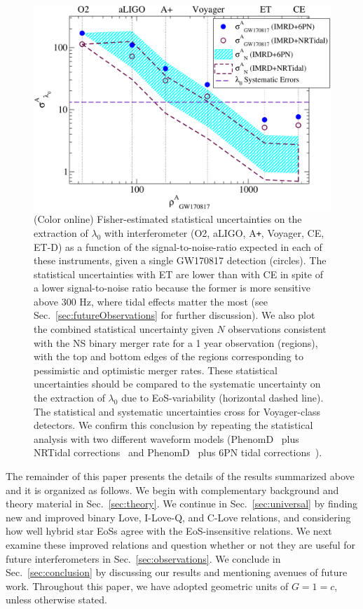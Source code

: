 \documentclass[prd,twocolumn,nofootinbib,superscriptaddress,amsmath,amssymb]{revtex4-1}
\begin{document}
\begin{figure}
\begin{center} 
\includegraphics[width=\columnwidth]{stackedFisher.pdf}
\end{center}
\caption{(Color online) Fisher-estimated statistical uncertainties on the extraction of $\lambda_{0}$ with interferometer (O2, aLIGO, A\texttt{+}, Voyager, CE, ET-D) as a function of the signal-to-noise-ratio expected in each of these instruments, given a single GW170817 detection (circles). The statistical uncertainties with ET are lower than with CE in spite of a lower signal-to-noise ratio because the former is more sensitive above 300 Hz, where tidal effects matter the most (see Sec.~\ref{sec:futureObservations} for further discussion). We also plot the combined statistical uncertainty given $N$ observations consistent with the NS binary merger rate for a 1 year observation (regions), with the top and bottom edges of the regions corresponding to pessimistic and optimistic merger rates. These statistical uncertainties should be compared to the systematic uncertainty on the extraction of $\lambda_{0}$ due to EoS-variability (horizontal dashed line). The statistical and systematic uncertainties cross for Voyager-class detectors. We confirm this conclusion by repeating the statistical analysis with two different waveform models (PhenomD~\cite{PhenomDI,PhenomDII} plus NRTidal corrections~\cite{Dietrich:2017aum,Samajdar:NRTidal} and PhenomD~\cite{PhenomDI,PhenomDII} plus 6PN tidal corrections~\cite{Vines:2011ud,Wade:tidalCorrections}).}
\label{fig:stackedFisher}
\end{figure} 

The remainder of this paper presents the details of the results summarized above and it is organized as follows. 
We begin with complementary background and theory material in Sec.~\ref{sec:theory}.
We continue in Sec.~\ref{sec:universal} by finding new and improved binary Love, I-Love-Q, and C-Love relations, and considering how well hybrid star EoSs agree with the EoS-insensitive relations.
We next examine these improved relations and question whether or not they are useful for future interferometers in Sec.~\ref{sec:observations}.
We conclude in Sec.~\ref{sec:conclusion} by discussing our results and mentioning avenues of future work.
Throughout this paper, we have adopted geometric units of $G=1=c$, unless otherwise stated.
\end{document}
